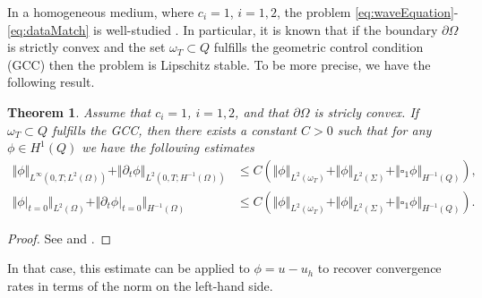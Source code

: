 \documentclass[sn-mathphys-num]{sn-jnl}
\newtheorem{thm}{Theorem}[section]
\numberwithin{equation}{section}
\newcommand{\dt}{\partial_t}
\begin{document}
\noindent In a homogeneous medium, where $c_i = 1$, $i = 1,2$, the problem \eqref{eq:waveEquation}-\eqref{eq:dataMatch} is well-studied \cite{BFO20,BFMO21,DMS23}. In particular, it is known that if the boundary $\partial \Omega$ is strictly convex and the set $\omega_T \subset Q$ fulfills the geometric control condition (GCC) \cite{BLR88,BLR92} then the problem is Lipschitz stable. To be more precise, we have the following result.

\begin{thm}\label{thm:Lipschitz}
    Assume that $c_i = 1$, $i = 1,2$, and that $\partial \Omega$ is stricly convex. If $\omega_T \subset Q$ fulfills the GCC, then there exists a constant $C > 0$ such that for any $\phi \in H^1(Q)$ we have the following estimates
    \begin{align*}
        \Vert \phi \Vert_{L^\infty(0,T;L^2(\Omega))} + \Vert \dt \phi \Vert_{L^2(0,T;H^{-1}(\Omega))} &\le C \left(  \Vert \phi \Vert_{L^2(\omega_T)} + \Vert \phi \Vert_{L^2(\Sigma)} + \Vert \square_1 \phi \Vert_{H^{-1}(Q)} \right), \\
        \Vert \phi \vert_{t = 0} \Vert_{L^2(\Omega)} + \Vert \dt \phi \vert_{t = 0} \Vert_{H^{-1}(\Omega)} &\le C \left(\Vert \phi \Vert_{L^2(\omega_T)} + \Vert \phi \Vert_{L^2(\Sigma)} + \Vert \square_1 \phi \Vert_{H^{-1}(Q)} \right). 
    \end{align*}
\end{thm}

\begin{proof}
    See \cite[Thm. A.4]{BFMO21control} and \cite[Rem. A.5]{BFMO21control}.
\end{proof}
In that case, this estimate can be applied to $\phi = u-u_h$ to recover convergence rates in terms of the norm on the left-hand side. 
\end{document}
